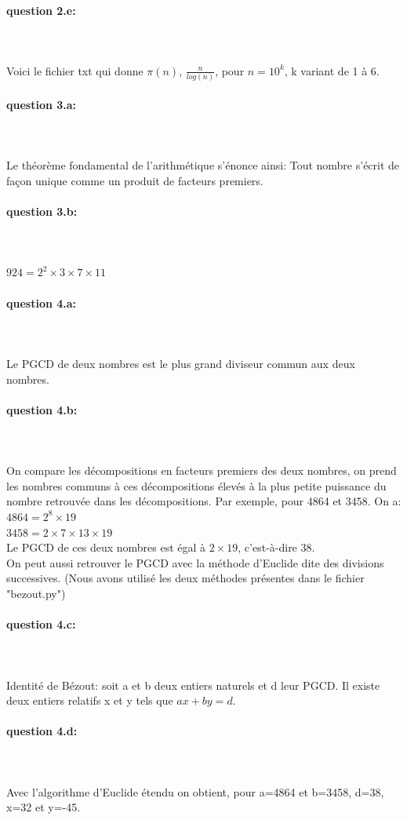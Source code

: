 \documentclass{article}
\begin{document}
\paragraph{question 2.e:}
~~\\
\\
Voici le fichier txt qui donne $\pi(n)$, $\frac{n}{log(n)}$, pour $n=10^{k}$, k variant de 1 à 6.

\paragraph{question 3.a:}
~~\\
\\
Le théorème fondamental de l'arithmétique s'énonce ainsi: Tout nombre s'écrit de façon unique comme un produit de facteurs premiers.
\paragraph{question 3.b:}
~~\\
\\
$924=2^{2}\times3\times7\times11$
\paragraph{question 4.a:}
~~\\
\\
Le PGCD de deux nombres est le plus grand diviseur commun aux deux nombres.
\paragraph{question 4.b:}
~~\\
\\
On compare les décompositions en facteurs premiers des deux nombres, on prend les nombres communs à ces décompositions élevés à la plus petite puissance du nombre retrouvée dans les décompositions.
Par exemple, pour 4864 et 3458. On a:
\\
$4864=2^{8}\times19$
\\
$3458=2\times7\times13\times19$
\\
Le PGCD de ces deux nombres est égal à $2\times19$, c'est-à-dire 38.
\\
On peut aussi retrouver le PGCD avec la méthode d'Euclide dite des divisions successives. (Nous avons utilisé les deux méthodes présentes dans le fichier "bezout.py")
\paragraph{question 4.c:}
~~\\
\\
Identité de Bézout: soit a et b deux entiers naturels et d leur PGCD. Il existe deux entiers relatifs x et y tels que $ax+by=d$.
\paragraph{question 4.d:}
~~\\
\\
Avec l'algorithme d'Euclide étendu on obtient, pour a=4864 et b=3458, d=38, x=32 et y=-45.
\end{document}
